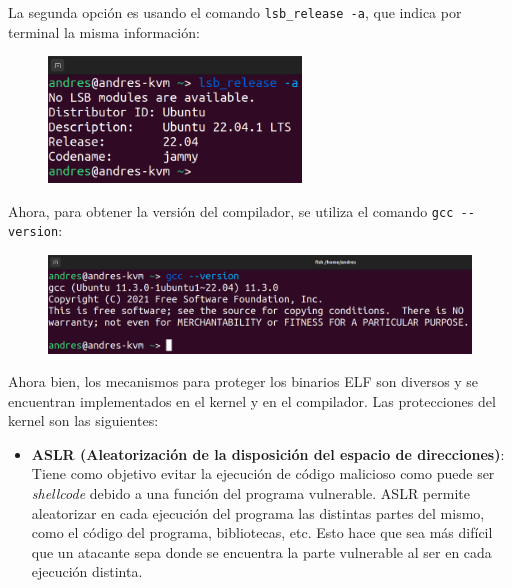 \documentclass{article}
\begin{document}
\bigskip

La segunda opción es usando el comando \verb|lsb_release -a|, que indica por terminal la misma información:

\begin{figure}[H]
    \centering
    \includegraphics[width=0.6\textwidth]{imagenes/Captura desde 2022-11-23 10-38-58.png}
\end{figure}

\bigskip

Ahora, para obtener la versión del compilador, se utiliza el comando \verb|gcc --version|:

\begin{figure}[H]
    \includegraphics[width=\textwidth]{imagenes/Captura desde 2022-11-23 10-39-52.png}
\end{figure}

\newpage

Ahora bien, los mecanismos para proteger los binarios ELF son diversos y se encuentran implementados en el kernel y en el compilador. Las protecciones del kernel son las siguientes:

\begin{itemize}
    \item \textbf{ASLR (Aleatorización de la disposición del espacio de direcciones)}: Tiene como objetivo evitar la ejecución de código malicioso como puede ser \textit{shellcode} debido a una función del programa vulnerable. ASLR permite aleatorizar en cada ejecución del programa las distintas partes del mismo, como el código del programa, bibliotecas, etc. Esto hace que sea más difícil que un atacante sepa donde se encuentra la parte vulnerable al ser en cada ejecución distinta.
\end{itemize}
\end{document}
